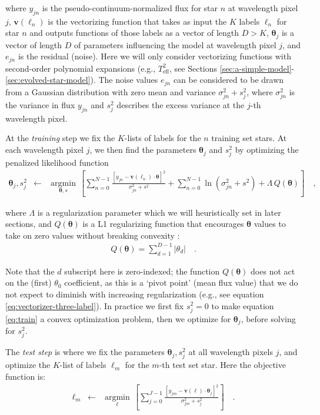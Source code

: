 \documentclass[preprint,trackchanges]{aastex}
\newcommand{\teff}{T_{\mathrm{eff}}}
\newcommand{\Dvector}[1]{\boldsymbol{#1}}
\newcommand{\vectheta}{\Dvector{\theta}}
\newcommand{\vecv}{\Dvector{v}}
\newcommand{\argmin}[1]{\underset{#1}{\operatorname{argmin}}\,}
\begin{document}
\noindent{}where $y_{jn}$ is the pseudo-continuum-normalized flux for star $n$ at wavelength pixel
$j$, $\vecv(\ell_n)$ is the vectorizing function that takes as input the $K$ labels
$\ell_n$ for star $n$ and outputs functions of those labels as a vector of length
$D>K$, $\vectheta_j$ is a vector of length $D$ of parameters influencing the model at
wavelength pixel $j$, and $e_{jn}$ is the residual (noise).  Here we will only consider
vectorizing functions with second-order polynomial expansions (e.g., $\teff^2$, see Sections 
\ref{sec:a-simple-model}-\ref{sec:evolved-star-model}).  The noise values $e_{jn}$ can 
be considered to be drawn from a Gaussian distribution with zero mean and variance 
$\sigma_{jn}^2 + s_j^2$, where $\sigma_{jn}^2$ is the variance in flux $y_{jn}$ and 
$s_j^2$ describes the excess variance at the $j$-th wavelength pixel. 


At the \emph{training} step we fix the $K$-lists of labels for the $n$ training set stars.
At each wavelength pixel $j$, we then find the parameters $\vectheta_j$ and $s_j^2$
by optimizing the penalized likelihood function
\begin{eqnarray}\label{eq:train}
\vectheta_j,s^2_j &\leftarrow& \argmin{\vectheta,s}\left[
    \sum_{n=0}^{N-1} \frac{[y_{jn}-\vecv(\ell_n)\cdot\vectheta]^2}{\sigma^2_{jn}+s^2}
    + \sum_{n=0}^{N-1} \ln(\sigma^2_{jn}+s^2) + \Lambda{}\,Q(\vectheta)
    \right]
  \quad ,
\end{eqnarray}

\noindent{}where $\Lambda$ is a regularization parameter which we will heuristically set
in later sections, and $Q(\vectheta)$ is a L1 regularizing function that encourages 
$\vectheta$ values to take on zero values without breaking convexity \citep{Casey_2016b}:
\begin{eqnarray}\label{eq:regularization-function}
	Q(\vectheta) = \sum_{d=1}^{D-1} |{\theta_d}| \quad .
\end{eqnarray}

Note that the $d$ subscript here is zero-indexed; the function $Q(\vectheta)$ does not act
on the (first) $\theta_0$ coefficient, as this is a `pivot point' (mean flux value) that 
we do not expect to diminish with increasing regularization (e.g., see equation 
\ref{eq:vectorizer-three-label}).  In practice we first fix $s_j^2 = 0$ to make equation
\ref{eq:train} a convex optimization problem, then we optimize for $\vectheta_j$, before 
solving for $s_j^2$.  


The \emph{test step} is where we fix the parameters $\vectheta_j,s_j^2$ at all wavelength
pixels $j$, and optimize the $K$-list of labels $\ell_m$ for the $m$-th test set star.  Here
the objective function is:
\begin{eqnarray}\label{eq:test}
  \ell_m &\leftarrow& \argmin{\ell}\left[
    \sum_{j=0}^{J-1} \frac{[y_{jm}-\vecv(\ell)\cdot\vectheta_j]^2}{\sigma_{jm}^2 + s_j^2}
    \right]
  \quad .
\end{eqnarray}
\end{document}
